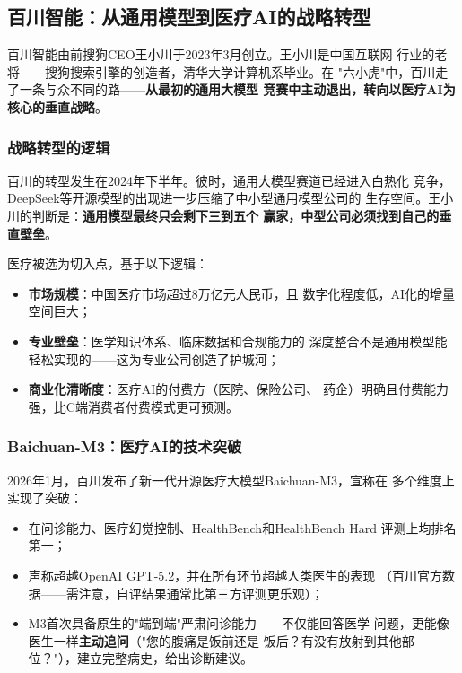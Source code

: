 \subsection{百川智能：从通用模型到医疗AI的战略转型}
\label{subsec:baichuan}

百川智能由前搜狗CEO王小川于2023年3月创立。王小川是中国互联网
行业的老将——搜狗搜索引擎的创造者，清华大学计算机系毕业。在
"六小虎"中，百川走了一条与众不同的路——\textbf{从最初的通用大模型
竞赛中主动退出，转向以医疗AI为核心的垂直战略}。

\subsubsection{战略转型的逻辑}
百川的转型发生在2024年下半年。彼时，通用大模型赛道已经进入白热化
竞争，DeepSeek等开源模型的出现进一步压缩了中小型通用模型公司的
生存空间。王小川的判断是：\textbf{通用模型最终只会剩下三到五个
赢家，中型公司必须找到自己的垂直壁垒}。

医疗被选为切入点，基于以下逻辑：
\begin{itemize}
  \item \textbf{市场规模}：中国医疗市场超过8万亿元人民币，且
    数字化程度低，AI化的增量空间巨大；
  \item \textbf{专业壁垒}：医学知识体系、临床数据和合规能力的
    深度整合不是通用模型能轻松实现的——这为专业公司创造了护城河；
  \item \textbf{商业化清晰度}：医疗AI的付费方（医院、保险公司、
    药企）明确且付费能力强，比C端消费者付费模式更可预测。
\end{itemize}

\subsubsection{Baichuan-M3：医疗AI的技术突破}
2026年1月，百川发布了新一代开源医疗大模型Baichuan-M3，宣称在
多个维度上实现了突破：
\begin{itemize}
  \item 在问诊能力、医疗幻觉控制、HealthBench和HealthBench Hard
    评测上均排名第一；
  \item 声称超越OpenAI GPT-5.2，并在所有环节超越人类医生的表现
    （百川官方数据——需注意，自评结果通常比第三方评测更乐观）；
  \item M3首次具备原生的"端到端"严肃问诊能力——不仅能回答医学
    问题，更能像医生一样\textbf{主动追问}（"您的腹痛是饭前还是
    饭后？有没有放射到其他部位？"），建立完整病史，给出诊断建议。
\end{itemize}

